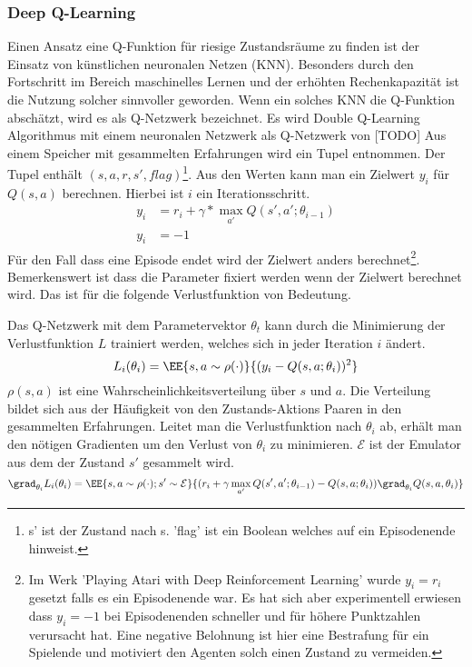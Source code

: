 \documentclass[a4paper,titlepage]{article}
\numberwithin{equation}{section} %
\begin{document}
{\subsubsection{Deep Q-Learning}
Einen Ansatz eine Q-Funktion für riesige Zustandsräume zu finden ist der Einsatz von künstlichen neuronalen Netzen (KNN). Besonders durch den Fortschritt im Bereich maschinelles Lernen und der erhöhten Rechenkapazität ist die Nutzung solcher sinnvoller geworden. Wenn ein solches KNN die Q-Funktion abschätzt, wird es als Q-Netzwerk bezeichnet\cite{mnihHumanlevelControlDeep2015b}.
Es wird Double Q-Learning Algorithmus mit einem neuronalen Netzwerk als Q-Netzwerk von \cite{vanhasseltDeepReinforcementLearning2015}[TODO]
Aus einem Speicher mit gesammelten Erfahrungen wird ein Tupel entnommen. Der Tupel enthält $(s, a, r, s', flag)$\footnote{s' ist der Zustand nach s. 'flag' ist ein Boolean welches auf ein Episodenende hinweist.}. Aus den Werten kann man ein Zielwert $y_i$ für $Q(s,a)$ berechnen. Hierbei ist $i$ ein Iterationsschritt.
\begin{align}
	y_i &= r_i + \gamma * \max_{a'}Q(s', a'; \theta_{i-1})\nonumber \\
	y_i &= -1 \nonumber
\end{align}
Für den Fall dass eine Episode endet wird der Zielwert anders berechnet\footnote{Im Werk 'Playing Atari with Deep Reinforcement Learning'\cite{mnihHumanlevelControlDeep2015b} wurde $y_i = r_i$ gesetzt falls es ein Episodenende war. Es hat sich aber experimentell erwiesen dass $y_i=-1$ bei Episodenenden schneller und für höhere Punktzahlen verursacht hat. Eine negative Belohnung ist hier eine Bestrafung für ein Spielende und motiviert den Agenten solch einen Zustand zu vermeiden.}. Bemerkenswert ist dass die Parameter fixiert werden wenn der Zielwert berechnet wird. Das ist für die folgende Verlustfunktion von Bedeutung.

Das Q-Netzwerk mit dem Parametervektor $\theta_t$ kann durch die Minimierung der Verlustfunktion $L$ trainiert werden, welches sich in jeder Iteration $i$ ändert.
\begin{equation}
	L_i(\theta_{i}) = \EE{s,a\sim \rho(\cdot)}{(y_i - Q(s,a;\theta_i))^2}
\end{equation}
$\rho(s, a)$ ist eine Wahrscheinlichkeitsverteilung über $s$ und $a$. Die Verteilung bildet sich aus der Häufigkeit von den Zustands-Aktions Paaren in den gesammelten Erfahrungen. Leitet man die Verlustfunktion nach $\theta_i$ ab, erhält man den nötigen Gradienten um den Verlust von $\theta_i$ zu minimieren. $\mathcal{E}$ ist der Emulator aus dem der Zustand $s'$ gesammelt wird.
\begin{equation}
	\grad_{\theta_i}L_i(\theta_i) = \EE{s,a\sim \rho(\cdot);s'\sim\mathcal{E}}{(r_i + \gamma \max_{a'}Q(s', a';\theta_{i-1}) - Q(s,a;\theta_i))\grad_{\theta_i}Q(s,a,\theta_i)}
\end{equation}

}
\end{document}
